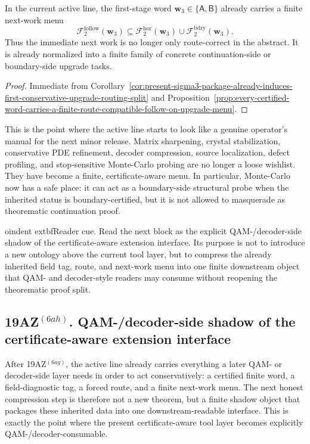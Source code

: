 \begin{corollary}
\label{cor:present-sigma3-package-already-carries-a-finite-next-work-menu}
In the current active line, the first-stage word \(\mathbf w_3\in\{\mathsf A,\mathsf B\}\) already carries a finite next-work menu
\[
  \mathcal F^{\mathrm{follow}}_{2}(\mathbf w_3)
  \subseteq
  \mathcal F^{\mathrm{hor}}_{2}(\mathbf w_3)\cup \mathcal F^{\mathrm{bdry}}_{2}(\mathbf w_3).
\]
Thus the immediate next work is no longer only route-correct in the abstract. It is already normalized into a finite family of concrete continuation-side or boundary-side upgrade tasks.
\end{corollary}

\begin{proof}
Immediate from Corollary~\ref{cor:present-sigma3-package-already-induces-first-conservative-upgrade-routing-split} and Proposition~\ref{prop:every-certified-word-carries-a-finite-route-compatible-follow-on-upgrade-menu}.
\end{proof}

\begin{remark}
\label{rem:what-this-finite-next-work-menu-now-buys}
This is the point where the active line starts to look like a genuine operator's manual for the next minor release. Matrix sharpening, crystal stabilization, conservative PDE refinement, decoder compression, source localization, defect profiling, and stop-sensitive Monte-Carlo probing are no longer a loose wishlist. They have become a finite, certificate-aware menu. In particular, Monte-Carlo now has a safe place: it can act as a boundary-side structural probe when the inherited status is boundary-certified, but it is not allowed to masquerade as theorematic continuation proof.
\end{remark}




oindent	extbf{Reader cue.} Read the next block as the explicit QAM-/decoder-side shadow of the certificate-aware extension interface. Its purpose is not to introduce a new ontology above the current tool layer, but to compress the already inherited field tag, route, and next-work menu into one finite downstream object that QAM- and decoder-style readers may consume without reopening the theorematic proof split.

\subsection*{19AZ$^{(6ah)}$. QAM-/decoder-side shadow of the certificate-aware extension interface}
\label{sec:qam-decoder-side-shadow-of-the-certificate-aware-extension-interface}
After 19AZ$^{(6ag)}$, the active line already carries everything a later QAM- or decoder-side layer needs in order to act conservatively: a certified finite word, a field-diagnostic tag, a forced route, and a finite next-work menu. The next honest compression step is therefore not a new theorem, but a finite shadow object that packages these inherited data into one downstream-readable interface. This is exactly the point where the present certificate-aware tool layer becomes explicitly QAM-/decoder-consumable.

